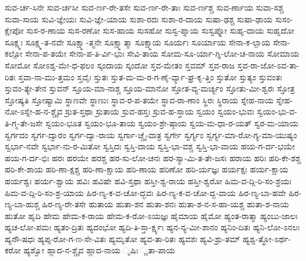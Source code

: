 {ಸುವ-ರ್ಚ-ಸಿನೇ
ಸುವ-ರ್ಚಸೀ
ಸುವ-ರ್ಣ-ರೇ-ತಸೇ
ಸುವ-ರ್ಣ-ರೇ-ತಾಃ
ಸುವ-ರ್ಣಶ್ಚ
ಸುವ-ರ್ಣಾಯ
ಸುವಾ-ಸಶ್ಚ
ಸುವಾ-ಸಾಯ
ಸುವಿ-ಜ್ಞೇಯಃ
ಸುವಿ-ಜ್ಞೇ-ಯಾಯ
ಸುಶಾ-ರದಃ
ಸುಶಾ-ರ-ದಾಯ
ಸುಷಾ-ಢಶ್ಚ
ಸುಷಾ-ಢಾಯ
ಸುಸಂ-ಕ್ಷೇಪೋ
ಸುಸ-ರ-ಣಾಯ
ಸುಸ-ರಣೋ
ಸುಸ-ಹಾಯ
ಸುಸಹೋ
ಸುಸ್ವ-ಪ್ನಾಯ
ಸುಸ್ವಪ್ನೋ
ಸುಹೃ-ದಾಯ
ಸುಹೃದೋ
ಸೂಕ್ಷ್ಮಃ
ಸೂಕ್ಷ್ಮ-ತ-ನವೇ
ಸೂಕ್ಷ್ಮಾ-ತ್ಮನೇ
ಸೂಕ್ಷ್ಮಾತ್ಮಾ
ಸೂಕ್ಷ್ಮಾಯ
ಸೂರ್ಯಃ
ಸೂರ್ಯಾಯ
ಸೇನಾ-ಕ-ಲ್ಪಾಯ
ಸೇನಾ-ಕಲ್ಪೋ
ಸೇನಾ-ಪ-ತಯೇ
ಸೇನಾ-ಪ-ತಿ-ರ್ವಿ-ಭುಃ
ಸೇವಿ-ತಾಯ
ಸೋಮ-ಸೂ-ರ್ಯಾ-ಗ್ನಿ-ಲೋ-ಚ-ನಾಯ
ಸೋಮಾಯ
ಸೋಮೋ
ಸೋಽಶ್ವ-ಮೇ-ಧ-ಫಲಂ
ಸ್ಕಂದಾಯ
ಸ್ಕಂದೋ
ಸ್ತವ-ಮೇತಂ
ಸ್ತವಮ್
ಸ್ತವ-ರಾಜ
ಸ್ತವ-ರಾ-ಜೋ-ಽವ-ತಾ-ರಿತಃ
ಸ್ತವಾ-ನಾ-ಮು-ತ್ತಮಂ
ಸ್ತವೈಃ
ಸ್ತುತಃ
ಸ್ತುತ-ಮ-ಮ-ರ-ಗ-ಣೈ-ರ್ವ್ಯಾ-ಘ್ರ-ಕೃ-ತ್ತಿಂ
ಸ್ತುತೋ
ಸ್ತುತ್ಯಂ
ಸ್ತುವಂತಃ
ಸ್ತುವಂ-ತ್ಯೇ-ತೇನ
ಸ್ತುವನ್
ಸ್ತೂಯ-ಮಾ-ನಾಶ್ಚ
ಸ್ತೂಯ-ಮಾನೋ
ಸ್ತೋತ-ವ್ಯ-ಮರ್ಚ್ಯಂ
ಸ್ತೋತು-ಮೀ-ಶ್ವರಃ
ಸ್ತೋತ್ರ
ಸ್ತೋಷ್ಯತಿ
ಸ್ತೋಷ್ಯಾಮಿ
ಸ್ಥಾಣವೇ
ಸ್ಥಾಣುಃ
ಸ್ಥಾವ-ರ-ಪ-ತಯೇ
ಸ್ಥಾವ-ರಾ-ಣಾಂ
ಸ್ಥಿರಃ
ಸ್ಥಿರಾಯ
ಸ್ನೇಹ-ನಾಯ
ಸ್ನೇಹ-ನೋ-ಽಸ್ನೇ-ಹ-ನ-ಶ್ಚೈವ
ಸ್ರುತ-ಸ್ತಥಾ
ಸ್ರುತಾಯ
ಸ್ರುವ-ಹಸ್ತಃ
ಸ್ರುವ-ಹ-ಸ್ತಾಯ
ಸ್ವಯಂ
ಸ್ವಯಂ-ಭುವಃ
ಸ್ವಯಂ-ಭು-ವ-ತಿ-ಗ್ಮ-ತೇ-ಜಸೇ
ಸ್ವಯಂ-ಭೂತ
ಸ್ವಯಂ-ಭೂ-ತಾಯ
ಸ್ವಯಂ-ಶ್ರೇ-ಷ್ಠಾಯ
ಸ್ವಯ-ಮ-ಧಾ-ರ-ಯತ್
ಸ್ವರ-ಮ-ಯಾಯ
ಸ್ವರ್ಗದಂ
ಸ್ವರ್ಗ-ದ್ವಾರಂ
ಸ್ವರ್ಗ-ದ್ವಾ-ರಾಯ
ಸ್ವರ್ಗಾ-ಚ್ಚೈ-ವಾತ್ರ
ಸ್ವರ್ಗೇ
ಸ್ವರ್ಗ್ಯಂ
ಸ್ವರ್ಗ್ಯ-ಮಾ-ರೋ-ಗ್ಯ-ಮಾ-ಯುಷ್ಯಂ
ಸ್ವರ್ಭಾ-ನವೇ
ಸ್ವರ್ಭಾ-ನು-ರ-ಮಿತೋ
ಸ್ವಸ್ತಿದಃ
ಸ್ವಸ್ತಿ-ದಾಯ
ಸ್ವಸ್ತಿ-ಭಾ-ವಶ್ಚ
ಸ್ವಸ್ತಿ-ಭಾ-ವಾಯ
ಹಯ-ಗ-ರ್ದ-ಭಯೇ
ಹಯ-ಗ-ರ್ದ-ಭಿಃ
ಹರಃ
ಹರಯೇ
ಹರಶ್ಚ
ಹರ-ಸು-ಲೋ-ಚನಃ
ಹರ-ಸ್ಯಾ-ಮಿ-ತ-ತೇ-ಜಸಃ
ಹರಾಯ
ಹರಿಃ
ಹರಿ-ಕೇ-ಶಶ್ಚ
ಹರಿ-ಕೇ-ಶಾಯ
ಹರಿ-ಣಾ-ಕ್ಷಶ್ಚ
ಹರಿ-ಣಾ-ಕ್ಷಾಯ
ಹರಿ-ಣಾಯ
ಹರಿಣೋ
ಹರಿ-ರ್ಯಜ್ಞಃ
ಹರ್ಯಕ್ಷಃ
ಹರ್ಯ-ಕ್ಷಾಯ
ಹರ್ಯಶ್ವಃ
ಹರ್ಯ-ಶ್ವಾಯ
ಹವಿಃ
ಹವಿಷೇ
ಹವಿ-ಸ್ತಥಾ
ಹಸ್ತೀ-ಶ್ವ-ರಾಯ
ಹಸ್ತೀ-ಶ್ವರೋ
ಹಿಮ-ವ-ದ್ಗಿ-ರಿ-ಸಂ-ಶ್ರಯಃ
ಹಿಮ-ವ-ದ್ಗಿ-ರಿ-ಸಂ-ಶ್ರ-ಯಾಯ
ಹಿರ-ಣ್ಯ-ಕ-ವ-ಚೋ-ದ್ಭವಃ
ಹಿರ-ಣ್ಯ-ಕ-ವ-ಚೋ-ದ್ಭ-ವಾಯ
ಹಿರ-ಣ್ಯ-ಬಾ-ಹವೇ
ಹಿರ-ಣ್ಯ-ಬಾ-ಹುಶ್ಚ
ಹಿರ-ಣ್ಯ-ರೇ-ತಸೇ
ಹುತಾಯ
ಹುತಾ-ಶನ
ಹುತಾ-ಶನಃ
ಹುತಾ-ಶ-ನ-ಸ-ಹಾ-ಯಶ್ಚ
ಹುತಾ-ಶ-ನಾಯ
ಹುತೋ
ಹೃದಿ
ಹೇಮ
ಹೇಮ-ಕ-ರಾಯ
ಹೇಮ-ಕ-ರೋ-ಽಯಜ್ಞಃ
ಹೈಮಾಯ
ಹೈಮೋ
ಹ್ಯಂತ-ರಾತ್ಮಾ
ಹ್ಯಂಬು-ಜಾಲಃ
ಹ್ಯಚ-ಲೋ-ಪಮಃ
ಹ್ಯತಂ-ದ್ರಿತಃ
ಹ್ಯದಂಭೋ
ಹ್ಯದಿ-ತಿ-ಸ್ತಾ-ರ್ಕ್ಷ್ಯಃ
ಹ್ಯನ-ನ್ಯ-ಮೀ-ಶಾನಂ
ಹ್ಯನಿಂ-ದಿತಃ
ಹ್ಯನಿ-ಲೋ-ಽನಲಃ
ಹ್ಯನೌ-ಷಧಃ
ಹ್ಯಪ್ಸ-ರೋ-ಗ-ಣ-ಸೇ-ವಿತಃ
ಹ್ಯಮೃತೋ
ಹ್ಯವ-ತಾ-ರಿತಃ
ಹ್ಯವಶಃ
ಹ್ಯವಿ-ಶ್ರು-ತಮ್
ಹ್ಯಶ್ವ-ತ್ಥೋ-ಽರ್ಥ-ಕರೋ
ಹ್ಯಶ್ವೋ
ಹ್ಲಾದ-ನ-ಶ್ಚೈವ
ಹ್ಲಾದ-ನಾಯ
ೃಷಿಃ
್ಣತಾ-ಪಾಯ
}
